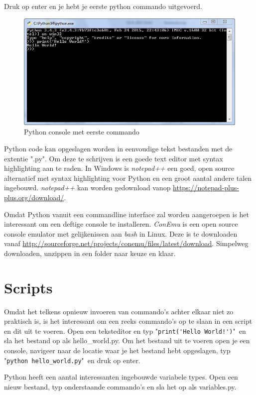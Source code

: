 \documentclass[11pt,twoside]{article}
\begin{document}
Druk op enter en je hebt je eerste python commando uitgevoerd.
\begin{figure}[ht]
	\centering
	\includegraphics[scale=0.5]{fig/Python34}
	\caption{Python console met eerste commando}
	\label{fig:Python34}
\end{figure}

Python code kan opgeslagen worden in eenvoudige tekst bestanden met de extentie "\textsf{.py}". Om deze te schrijven is een goede text editor met syntax highlighting aan te raden. In Windows is \emph{notepad++} een goed, open source alternatief met syntax highlighting voor Python en een groot aantal andere talen ingebouwd. \emph{notepad++} kan worden gedownload vanop \url{https://notepad-plus-plus.org/download/}.

Omdat Python vanuit een commandline interface zal worden aangeroepen is het interessant om een deftige console te installeren. \emph{ConEmu} is een open source console emulator met gelijkenissen aan \emph{bash} in Linux. Deze is te downloaden vanaf \url{http://sourceforge.net/projects/conemu/files/latest/download}. Simpelweg downloaden, unzippen in een folder naar keuze en klaar.

 	\section{Scripts}
Omdat het telkens opnieuw invoeren van commando's achter elkaar niet zo praktisch is, is het interessant om een reeks commando's op te slaan in een script en dit uit te voeren. Open een teksteditor en typ "\lstinline{print('Hello World!')}"\ en sla het bestand op als \textsf{hello\_world.py}. Om het bestand uit te voeren open je een console, navigeer naar de locatie waar je het bestand hebt opgeslagen, typ "\lstinline[language=bash]{python hello_world.py}"\ en druk op enter.

Python heeft een aantal interessanten ingebouwde variabele types. Open een nieuw bestand, typ onderstaande commando's en sla het op als \textsf{variables.py}.

\end{document}
